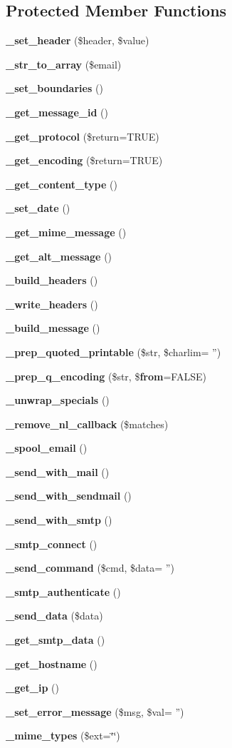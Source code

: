 \subsection*{Protected Member Functions}
\begin{DoxyCompactItemize}
\item 
{\bf \-\_\-set\-\_\-header} (\$header, \$value)
\item 
{\bf \-\_\-str\-\_\-to\-\_\-array} (\$email)
\item 
{\bf \-\_\-set\-\_\-boundaries} ()
\item 
{\bf \-\_\-get\-\_\-message\-\_\-id} ()
\item 
{\bf \-\_\-get\-\_\-protocol} (\$return=T\-R\-U\-E)
\item 
{\bf \-\_\-get\-\_\-encoding} (\$return=T\-R\-U\-E)
\item 
{\bf \-\_\-get\-\_\-content\-\_\-type} ()
\item 
{\bf \-\_\-set\-\_\-date} ()
\item 
{\bf \-\_\-get\-\_\-mime\-\_\-message} ()
\item 
{\bf \-\_\-get\-\_\-alt\-\_\-message} ()
\item 
{\bf \-\_\-build\-\_\-headers} ()
\item 
{\bf \-\_\-write\-\_\-headers} ()
\item 
{\bf \-\_\-build\-\_\-message} ()
\item 
{\bf \-\_\-prep\-\_\-quoted\-\_\-printable} (\$str, \$charlim= '')
\item 
{\bf \-\_\-prep\-\_\-q\-\_\-encoding} (\$str, \${\bf from}=F\-A\-L\-S\-E)
\item 
{\bf \-\_\-unwrap\-\_\-specials} ()
\item 
{\bf \-\_\-remove\-\_\-nl\-\_\-callback} (\$matches)
\item 
{\bf \-\_\-spool\-\_\-email} ()
\item 
{\bf \-\_\-send\-\_\-with\-\_\-mail} ()
\item 
{\bf \-\_\-send\-\_\-with\-\_\-sendmail} ()
\item 
{\bf \-\_\-send\-\_\-with\-\_\-smtp} ()
\item 
{\bf \-\_\-smtp\-\_\-connect} ()
\item 
{\bf \-\_\-send\-\_\-command} (\$cmd, \$data= '')
\item 
{\bf \-\_\-smtp\-\_\-authenticate} ()
\item 
{\bf \-\_\-send\-\_\-data} (\$data)
\item 
{\bf \-\_\-get\-\_\-smtp\-\_\-data} ()
\item 
{\bf \-\_\-get\-\_\-hostname} ()
\item 
{\bf \-\_\-get\-\_\-ip} ()
\item 
{\bf \-\_\-set\-\_\-error\-\_\-message} (\$msg, \$val= '')
\item 
{\bf \-\_\-mime\-\_\-types} (\$ext=\char`\"{}\char`\"{})
\end{DoxyCompactItemize}


